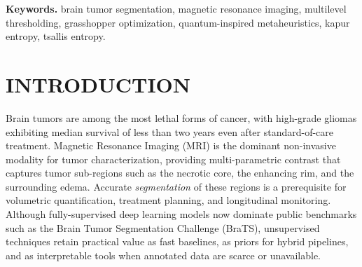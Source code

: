 {\cn
\begin{abstract}{Accurate multilevel segmentation of brain tumors from Magnetic Resonance Imaging (MRI) is fundamental to computer-aided diagnosis. Histogram-based thresholding remains an attractive baseline because it is unsupervised, fast, and interpretable; however, optimal threshold selection becomes intractable as the number of thresholds grows. Meta-heuristic optimizers such as the Grasshopper Optimization Algorithm (GOA) have been proposed for this task, but the standard GOA suffers from premature convergence and poor scalability to high dimensions. This paper introduces \emph{QIGOA}, a Quantum-Inspired Grasshopper Optimization Algorithm that integrates four components on top of the classical GOA: (i) a Q-bit population representation with a quantum rotation gate, (ii) an adaptive rotation angle modulated by the fitness gap and a cosine-annealed schedule, (iii) opposition-based learning at initialization combined with L\'evy-flight escape upon stagnation, and (iv) a memetic coordinate-descent refinement that eliminates the quantization noise inherent to bit-string observation. We evaluate QIGOA against six well-known meta-heuristics (GA, PSO, GOA, WOA, GWO, MPA) on 40 axial FLAIR slices from the BraTS 2020 challenge, with Kapur entropy at $k\in\{2,3,4,5,6,8,10\}$ and Tsallis entropy at $k\in\{3,5,8\}$, using 10--15 independent runs per configuration. Wilcoxon and Friedman tests show that QIGOA significantly outperforms its base GOA across every configuration (relative improvement ranging from 0.4\% at $k{=}2$ to 12.9\% at Tsallis $k{=}8$), beats the more recent MPA and WOA at high dimensionality, and reaches statistical parity with GA, GWO, and PSO on standard settings. These results validate quantum-inspired enhancement of swarm intelligence as a robust strategy for high-dimensional medical image thresholding.}
\vn
\end{abstract}
\textbf{Keywords.} brain tumor segmentation, magnetic resonance imaging, multilevel thresholding, grasshopper optimization, quantum-inspired metaheuristics, kapur entropy, tsallis entropy.
}

\section{INTRODUCTION}

Brain tumors are among the most lethal forms of cancer, with high-grade gliomas exhibiting median survival of less than two years even after standard-of-care treatment. Magnetic Resonance Imaging (MRI) is the dominant non-invasive modality for tumor characterization, providing multi-parametric contrast that captures tumor sub-regions such as the necrotic core, the enhancing rim, and the surrounding edema. Accurate \emph{segmentation} of these regions is a prerequisite for volumetric quantification, treatment planning, and longitudinal monitoring. Although fully-supervised deep learning models now dominate public benchmarks such as the Brain Tumor Segmentation Challenge (BraTS), unsupervised techniques retain practical value as fast baselines, as priors for hybrid pipelines, and as interpretable tools when annotated data are scarce or unavailable.

